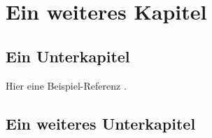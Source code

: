 \chapter{Ein weiteres Kapitel}
\label{chapter:kap2}
\section{Ein Unterkapitel}
Hier eine Beispiel-Referenz \cite{Jannach2010}.
\section{Ein weiteres Unterkapitel}